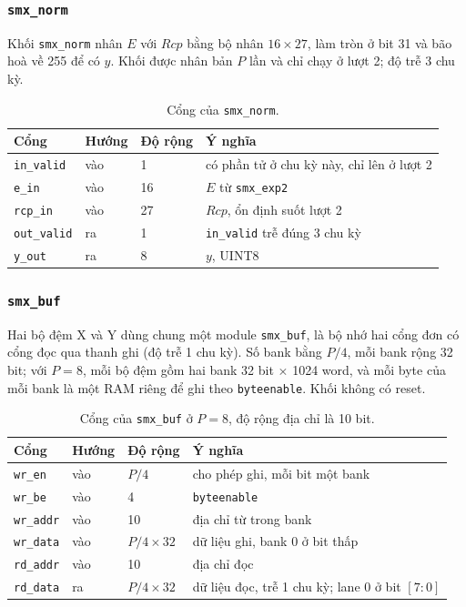 \subsubsection{\texttt{smx\_norm}}

Khối \texttt{smx\_norm} nhân $E$ với $\mathit{Rcp}$ bằng bộ nhân $16 \times 27$, làm tròn ở bit 31 và bão hoà về 255 để có $y$. Khối được nhân bản $P$ lần và chỉ chạy ở lượt 2; độ trễ 3 chu kỳ.

\begin{table}[htbp]
\centering
\small
\begin{tabular}{p{2.7cm}p{1.2cm}p{1.9cm}p{7.2cm}}
\toprule
Cổng & Hướng & Độ rộng & Ý nghĩa \\
\midrule
\texttt{in\_valid} & vào & 1 & có phần tử ở chu kỳ này, chỉ lên ở lượt 2 \\
\texttt{e\_in} & vào & 16 & $E$ từ \texttt{smx\_exp2} \\
\texttt{rcp\_in} & vào & 27 & $\mathit{Rcp}$, ổn định suốt lượt 2 \\
\texttt{out\_valid} & ra & 1 & \texttt{in\_valid} trễ đúng 3 chu kỳ \\
\texttt{y\_out} & ra & 8 & $y$, UINT8 \\
\bottomrule
\end{tabular}
\caption{Cổng của \texttt{smx\_norm}.}
\label{tab:p-norm}
\end{table}


\subsubsection{\texttt{smx\_buf}}

Hai bộ đệm X và Y dùng chung một module \texttt{smx\_buf}, là bộ nhớ hai cổng đơn có cổng đọc qua thanh ghi (độ trễ 1 chu kỳ). Số bank bằng $P/4$, mỗi bank rộng 32 bit; với $P = 8$, mỗi bộ đệm gồm hai bank 32 bit $\times$ 1024 word, và mỗi byte của mỗi bank là một RAM riêng để ghi theo \texttt{byteenable}. Khối không có reset.

\begin{table}[htbp]
\centering
\small
\begin{tabular}{p{2.7cm}p{1.2cm}p{1.9cm}p{7.2cm}}
\toprule
Cổng & Hướng & Độ rộng & Ý nghĩa \\
\midrule
\texttt{wr\_en} & vào & $P/4$ & cho phép ghi, mỗi bit một bank \\
\texttt{wr\_be} & vào & 4 & \texttt{byteenable} \\
\texttt{wr\_addr} & vào & 10 & địa chỉ từ trong bank \\
\texttt{wr\_data} & vào & $P/4 \times 32$ & dữ liệu ghi, bank 0 ở bit thấp \\
\texttt{rd\_addr} & vào & 10 & địa chỉ đọc \\
\texttt{rd\_data} & ra & $P/4 \times 32$ & dữ liệu đọc, trễ 1 chu kỳ; lane 0 ở bit $[7{:}0]$ \\
\bottomrule
\end{tabular}
\caption{Cổng của \texttt{smx\_buf} ở $P = 8$, độ rộng địa chỉ là 10 bit.}
\label{tab:p-buf}
\end{table}


